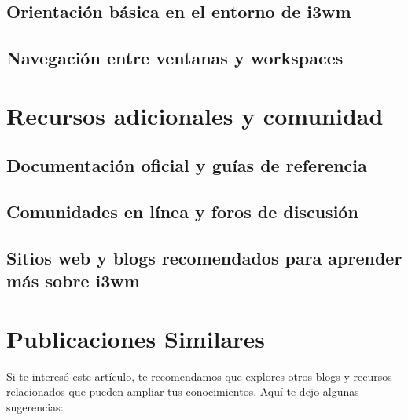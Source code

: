 \documentclass[
  jou,
  floatsintext,
  longtable,
  a4paper,
  nolmodern,
  notxfonts,
  notimes,
  colorlinks=true,linkcolor=blue,citecolor=blue,urlcolor=blue]{apa7}
\begin{document}
\subsection{Orientación básica en el entorno de
i3wm}\label{orientaciuxf3n-buxe1sica-en-el-entorno-de-i3wm}

\subsection{Navegación entre ventanas y
workspaces}\label{navegaciuxf3n-entre-ventanas-y-workspaces}

\section{Recursos adicionales y
comunidad}\label{recursos-adicionales-y-comunidad}

\subsection{Documentación oficial y guías de
referencia}\label{documentaciuxf3n-oficial-y-guuxedas-de-referencia}

\subsection{Comunidades en línea y foros de
discusión}\label{comunidades-en-luxednea-y-foros-de-discusiuxf3n}

\subsection{Sitios web y blogs recomendados para aprender más sobre
i3wm}\label{sitios-web-y-blogs-recomendados-para-aprender-muxe1s-sobre-i3wm}

\section{Publicaciones Similares}\label{publicaciones-similares}

Si te interesó este artículo, te recomendamos que explores otros blogs y
recursos relacionados que pueden ampliar tus conocimientos. Aquí te dejo
algunas sugerencias:
\end{document}
